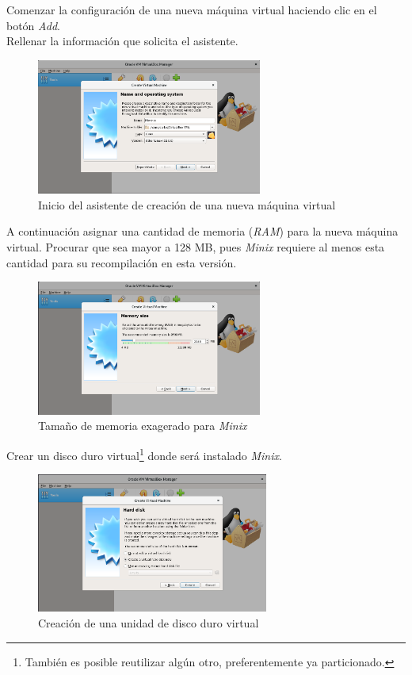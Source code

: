 \documentclass[12pt]{scrartcl}
\begin{document}
Comenzar la configuración de una nueva máquina virtual haciendo clic en el botón \textit{Add}.\\
Rellenar la información que solicita el asistente.
\begin{figure}[H]
  \centering
  \includegraphics[width=0.66\textwidth]{vb/1.png}
  \caption{Inicio del asistente de creación de una nueva máquina virtual}
\end{figure}

A continuación asignar una cantidad de memoria (\textit{RAM}) para la nueva máquina virtual.
Procurar que sea mayor a 128 MB, pues \textit{Minix} requiere al menos esta cantidad para su recompilación en esta versión.

\begin{figure}[H]
  \centering
  \includegraphics[width=0.66\textwidth]{vb/2.png}
  \caption{Tamaño de memoria exagerado para \textit{Minix}}
\end{figure}

Crear un disco duro virtual\footnote{También es posible reutilizar algún otro, preferentemente ya particionado.} donde será instalado \textit{Minix}.
\begin{figure}[H]
  \centering
  \includegraphics[width=0.68\textwidth]{vb/3.png}
  \caption{Creación de una unidad de disco duro virtual}
\end{figure}
\end{document}
